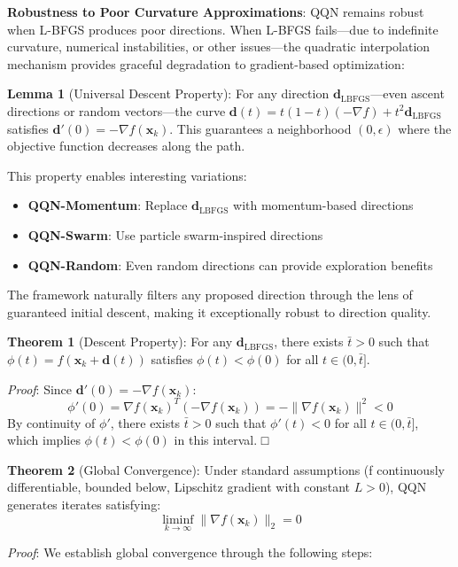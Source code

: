 \textbf{Robustness to Poor Curvature Approximations}: QQN remains robust when L-BFGS produces poor directions.
When L-BFGS fails---due to indefinite curvature, numerical instabilities, or other issues---the quadratic interpolation mechanism provides graceful degradation to gradient-based optimization:

\textbf{Lemma 1} (Universal Descent Property): For any direction \(\mathbf{d}_{\text{LBFGS}}\)---even ascent directions or random vectors---the curve \(\mathbf{d}(t) = t(1-t)(-\nabla f) + t^2 \mathbf{d}_{\text{LBFGS}}\) satisfies \(\mathbf{d}'(0) = -\nabla f(\mathbf{x}_k)\). This guarantees a neighborhood \((0, \epsilon)\) where the objective function decreases along the path.

This property enables interesting variations:

\begin{itemize}
\tightlist
\item
  \textbf{QQN-Momentum}: Replace \(\mathbf{d}_{\text{LBFGS}}\) with momentum-based directions
\item
  \textbf{QQN-Swarm}: Use particle swarm-inspired directions
\item
  \textbf{QQN-Random}: Even random directions can provide exploration benefits
\end{itemize}

The framework naturally filters any proposed direction through the lens of guaranteed initial descent, making it exceptionally robust to direction quality.

\textbf{Theorem 1} (Descent Property): For any \(\mathbf{d}_{\text{LBFGS}}\), there exists \(\bar{t} > 0\) such that \(\phi(t) = f(\mathbf{x}_k + \mathbf{d}(t))\) satisfies \(\phi(t) < \phi(0)\) for all \(t \in (0, \bar{t}]\).

\emph{Proof}: Since \(\mathbf{d}'(0) = -\nabla f(\mathbf{x}_k)\):
\[\phi'(0) = \nabla f(\mathbf{x}_k)^T (-\nabla f(\mathbf{x}_k)) = -\|\nabla f(\mathbf{x}_k)\|^2 < 0\]
By continuity of \(\phi'\), there exists \(\bar{t} > 0\) such that \(\phi'(t) < 0\) for all \(t \in (0, \bar{t}]\), which implies \(\phi(t) < \phi(0)\) in this interval. □

\textbf{Theorem 2} (Global Convergence): Under standard assumptions (f continuously differentiable, bounded below, Lipschitz
gradient with constant \(L > 0\)), QQN generates iterates satisfying:
\[\liminf_{k \to \infty} \|\nabla f(\mathbf{x}_k)\|_2 = 0\]

\emph{Proof}: We establish global convergence through the following steps:

